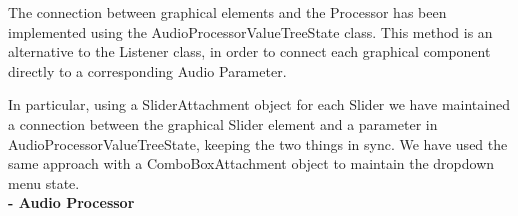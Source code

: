 \documentclass[letterpaper, 12pt]{article}
\begin{document}
	The connection between graphical elements and the Processor has been implemented using the AudioProcessorValueTreeState class. This method is an alternative to the Listener class, in order to connect each graphical component directly to a corresponding Audio Parameter.
	
	In particular, using  a SliderAttachment object for each Slider we have maintained a connection between the graphical Slider element and a parameter in AudioProcessorValueTreeState, keeping the two things in sync. We have used the same approach with a ComboBoxAttachment object to maintain the dropdown menu state.
	\\
	
	\textbf{-	Audio Processor 
}\\
	
	
	\begin{thebibliography}{99}
		
	\end{thebibliography}
	
	
\end{document}
